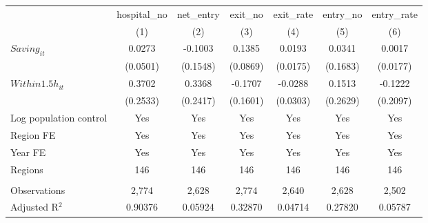 \begingroup
\centering
\begin{tabular}{lcccccc}
   \toprule
                          & hospital\_no  & net\_entry  & exit\_no  & exit\_rate  & entry\_no  & entry\_rate \\    
                          & (1)           & (2)         & (3)       & (4)         & (5)        & (6)\\  
   \midrule 
   $Saving_{it}$          & 0.0273        & -0.1003     & 0.1385    & 0.0193      & 0.0341     & 0.0017\\   
                          & (0.0501)      & (0.1548)    & (0.0869)  & (0.0175)    & (0.1683)   & (0.0177)\\   
   $Within1.5h_{it}$      & 0.3702        & 0.3368      & -0.1707   & -0.0288     & 0.1513     & -0.1222\\   
                          & (0.2533)      & (0.2417)    & (0.1601)  & (0.0303)    & (0.2629)   & (0.2097)\\   
   Log population control & Yes           & Yes         & Yes       & Yes         & Yes        & Yes\\  
   Region FE              & Yes           & Yes         & Yes       & Yes         & Yes        & Yes\\  
   Year FE                & Yes           & Yes         & Yes       & Yes         & Yes        & Yes\\  
   Regions                & 146           & 146         & 146       & 146         & 146        & 146\\  
    \\
   Observations           & 2,774         & 2,628       & 2,774     & 2,640       & 2,628      & 2,502\\  
   Adjusted R$^2$         & 0.90376       & 0.05924     & 0.32870   & 0.04714     & 0.27820    & 0.05787\\  
   \bottomrule
\end{tabular}
\par\endgroup
